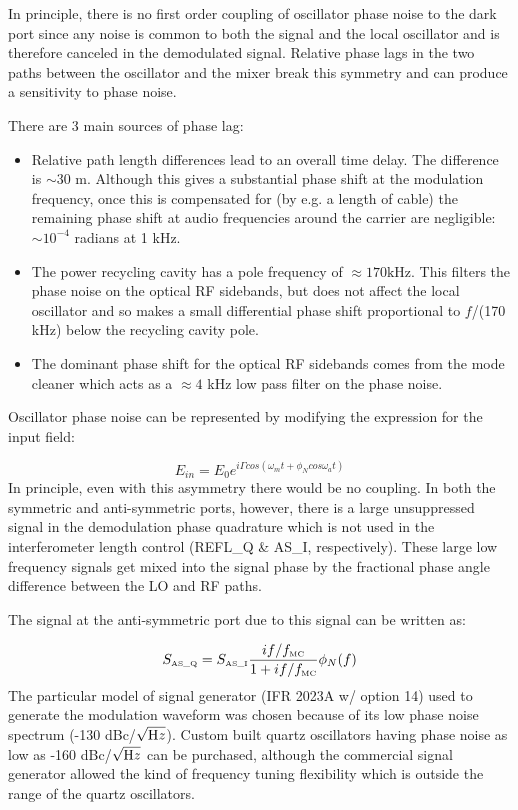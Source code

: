 In principle, there is no first order coupling of oscillator phase noise
to the dark port since any noise is common to both the signal and the local
oscillator and is therefore canceled
in the demodulated signal. Relative phase lags in the two paths between
the oscillator and the mixer break this symmetry and can produce a sensitivity
to phase noise.

There are 3 main sources of phase lag:
\begin{itemize}
\item Relative path length differences lead to an overall time delay. The
      difference is $\sim30$ m. Although this gives a substantial
      phase shift at the modulation frequency, once this is compensated
      for (by e.g. a length of cable) the remaining phase shift at audio
      frequencies around the carrier are negligible: $\sim10^{-4}$ radians
      at 1 kHz.

\item The power recycling cavity has a pole frequency of 
      $\approx170 \mbox{kHz}$. This filters the phase noise on the
      optical RF sidebands, but does not affect the local oscillator
      and so makes a small differential phase shift proportional to
      $f$/(170 kHz) below the recycling cavity pole.

\item The dominant phase shift for the optical RF sidebands comes from the 
      mode cleaner which acts as a $\approx4$ kHz low pass filter on the
      phase noise.
\end{itemize}

Oscillator phase noise can be represented by modifying the expression
for the input field:

\begin{equation}
E_{in} =
E_{0} e^{i \Gamma cos(\omega_{m}t + \phi_{N} cos \omega_{a} t)}
\end{equation}
In principle, even with this asymmetry there would be no coupling. In
both the symmetric and anti-symmetric ports, however, there is a large
unsuppressed signal in the demodulation phase quadrature which is not
used in the interferometer length control (REFL\_Q \& AS\_I, respectively).
These large low frequency signals get mixed into the signal phase by the
fractional phase angle difference between the LO and RF paths.

The signal at the anti-symmetric port due to this signal can be written as:

\begin{equation}
S_{\mbox{\tiny AS\_Q}} =
S_{\mbox{\tiny AS\_I}} \frac{i f /f_{\mbox{\tiny MC}}}{1 + i f /f_{\mbox{\tiny MC}}} 
                       \phi_N(f) 
\end{equation}
The particular model of signal generator (IFR 2023A w/ option 14)
used to generate the modulation waveform was chosen because of its
low phase noise spectrum (-130 dBc/$\sqrt{\mbox Hz}$). Custom built 
quartz oscillators having phase noise as low as -160 dBc/$\sqrt{\mbox Hz}$ 
can be purchased, although the commercial signal generator allowed the kind
of frequency tuning flexibility which is outside the range of the
quartz oscillators. 

